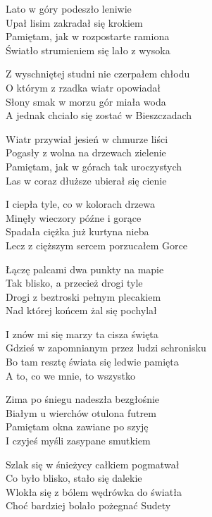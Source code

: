 \begin{text}
    \begin{scriptTwelve}
Lato w góry podeszło leniwie\\
Upał lisim zakradał się krokiem\\
Pamiętam, jak w rozpostarte ramiona\\
Światło strumieniem się lało z wysoka

Z wyschniętej studni nie czerpałem chłodu\\
O którym z rzadka wiatr opowiadał\\
Słony smak w morzu gór miała woda\\
A jednak chciało się zostać w Bieszczadach

Wiatr przywiał jesień w chmurze liści\\
Pogasły z wolna na drzewach zielenie\\
Pamiętam, jak w górach tak uroczystych\\
Las w coraz dłuższe ubierał się cienie

I ciepła tyle, co w kolorach drzewa\\
Minęły wieczory późne i gorące\\
Spadała ciężka już kurtyna nieba\\
Lecz z cięższym sercem porzucałem Gorce

Łączę palcami dwa punkty na mapie\\
Tak blisko, a przecież drogi tyle\\
Drogi z beztroski pełnym plecakiem\\
Nad której końcem żal się pochylał

I znów mi się marzy ta cisza święta\\
Gdzieś w zapomnianym przez ludzi schronisku\\
Bo tam resztę świata się ledwie pamięta\\
A to, co we mnie, to wszystko

Zima po śniegu nadeszła bezgłośnie\\
Białym u wierchów otulona futrem\\
Pamiętam okna zawiane po szyję\\
I czyjeś myśli zasypane smutkiem

Szlak się w śnieżycy całkiem pogmatwał\\
Co było blisko, stało się dalekie\\
Wlokła się z bólem wędrówka do światła\\
Choć bardziej bolało pożegnać Sudety


\end{scriptTwelve}
\end{text}
